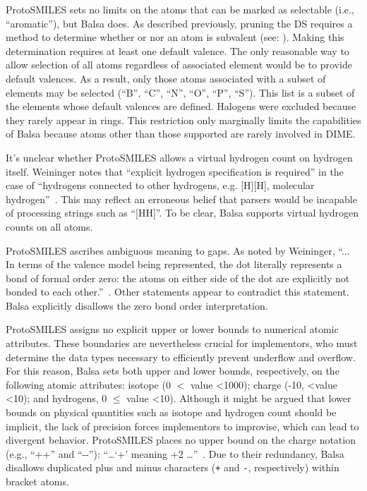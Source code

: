 \documentclass{article}
\def\ttt{\texttt}
\begin{document}
ProtoSMILES sets no limits on the atoms that can be marked as selectable (i.e., \enquote{aromatic}), but Balsa does. As described previously, pruning the DS requires a method to determine whether or nor an atom is subvalent (see: ). Making this determination requires at least one default valence. The only reasonable way to allow selection of all atoms regardless of associated element would be to provide default valences. As a result, only those atoms associated with a subset of elements may be selected (\enquote{B}, \enquote{C}, \enquote{N}, \enquote{O}, \enquote{P}, \enquote{S}). This list is a subset of the elements whose default valences are defined. Halogens were excluded because they rarely appear in rings. This restriction only marginally limits the capabilities of Balsa because atoms other than those supported are rarely involved in DIME.

It's unclear whether ProtoSMILES allows a virtual hydrogen count on hydrogen itself. Weininger notes that \enquote{explicit hydrogen specification is required} in the case of \enquote{hydrogens connected to other hydrogens, e.g. [H][H], molecular hydrogen}~\cite[p.~97]{weininger:2003}. This may reflect an erroneous belief that parsers would be incapable of processing strings such as \enquote{[HH]}. To be clear, Balsa supports virtual hydrogen counts on all atoms.

ProtoSMILES ascribes ambiguous meaning to gaps. As noted by Weininger, \enquote{... In terms of the valence model being represented, the dot literally represents a bond of formal order zero: the atoms on either side of the dot are explicitly not bonded to each other.}~\cite[p.~88]{weininger:2003}. Other statements appear to contradict this statement. Balsa explicitly disallows the zero bond order interpretation.

ProtoSMILES assigns no explicit upper or lower bounds to numerical atomic attributes. These boundaries are nevertheless crucial for implementors, who must determine the data types necessary to efficiently prevent underflow and overflow. For this reason, Balsa sets both upper and lower bounds, respectively, on the following atomic attributes: isotope (0 $<$ value \textless 1000); charge (-10, \textless value \textless 10); and hydrogens, 0 $\leq$ value \textless 10). Although it might be argued that lower bounds on physical quantities such as isotope and hydrogen count should be implicit, the lack of precision forces implementors to improvise, which can lead to divergent behavior. ProtoSMILES places no upper bound on the charge notation (e.g., \enquote{++} and \enquote{-{}-}): \enquote{\dots \enquote{+} meaning +2 \dots}~\cite[p.~94]{weininger:2003}. Due to their redundancy, Balsa disallows duplicated plus and minus characters (\ttt{+} and \ttt{-}, respectively) within bracket atoms.
\end{document}
